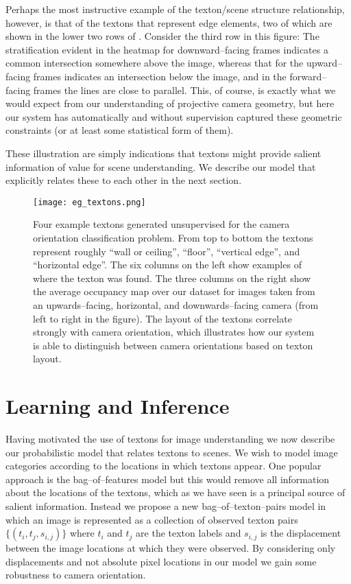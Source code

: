 Perhaps the most instructive example of the texton/scene structure
relationship, however, is that of the textons that represent edge
elements, two of which are shown in the lower two rows of
. Consider the third row in this figure: The
stratification evident in the heatmap for downward--facing frames
indicates a common intersection somewhere above the image, whereas
that for the upward--facing frames indicates an intersection below the
image, and in the forward--facing frames the lines are close to
parallel. This, of course, is exactly what we would expect from our
understanding of projective camera geometry, but here our system has
automatically and without supervision captured these geometric
constraints (or at least some statistical form of them).

These illustration are simply indications that textons might provide
salient information of value for scene understanding. We describe our
model that explicitly relates these to each other in the next section.

\begin{figure*}[htp]
\centering
\texttt{[image: eg\_textons.png]}
\caption{Four example textons generated unsupervised for the camera
  orientation classification problem. From top to bottom the textons
  represent roughly ``wall or ceiling'', ``floor'', ``vertical edge'',
  and ``horizontal edge''. The six columns on the left show examples
  of where the texton was found. The three columns on the right show
  the average occupancy map over our dataset for images taken from an
  upwards--facing, horizontal, and downwards--facing camera (from left
  to right in the figure). The layout of the textons correlate
  strongly with camera orientation, which illustrates how our system
  is able to distinguish between camera orientations based on texton
  layout.}
\label{fig:eg-textons}
\end{figure*}

\section{Learning and Inference}
\label{sect:approach}
Having motivated the use of textons for image understanding we now
describe our probabilistic model that relates textons to scenes. We
wish to model image categories according to the locations in which
textons appear. One popular approach is the bag--of--features model
\cite{Jebara03} but this would remove all information about the
locations of the textons, which as we have seen is a principal source
of salient information. Instead we propose a new
bag--of--texton--pairs model in which an image is represented as a
collection of observed texton pairs $\{(t_i, t_j, s_{i,j})\}$ where
$t_i$ and $t_j$ are the texton labels and $s_{i,j}$ is the
displacement between the image locations at which they were
observed. By considering only displacements and not absolute pixel
locations in our model we gain some robustness to camera orientation.

